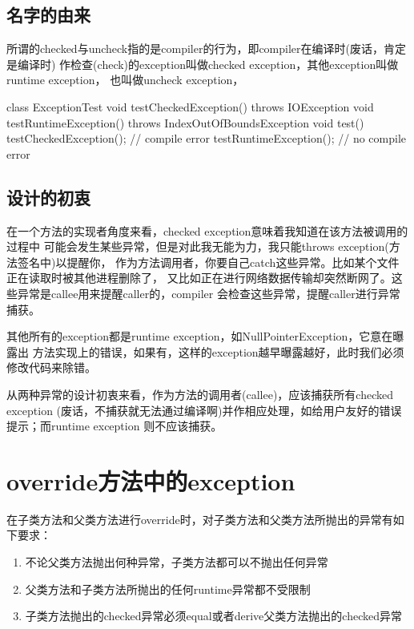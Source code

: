 \documentclass[a4paper,11pt]{article}
\begin{document}
\subsection[名字的由来]{名字的由来}
所谓的checked与uncheck指的是compiler的行为，即compiler在编译时(废话，肯定是编译时)
作检查(check)的exception叫做checked exception，其他exception叫做runtime exception，
也叫做uncheck exception，

\begin{javacode}
class ExceptionTest {
  void testCheckedException() throws IOException { }
  void testRuntimeException() throws IndexOutOfBoundsException { }
  void test() {
    testCheckedException(); // compile error
    testRuntimeException(); // no compile error
  }
}
\end{javacode}

\subsection[设计的初衷]{设计的初衷}
在一个方法的实现者角度来看，checked exception意味着我知道在该方法被调用的过程中
可能会发生某些异常，但是对此我无能为力，我只能throws exception(方法签名中)以提醒你，
作为方法调用者，你要自己catch这些异常。比如某个文件正在读取时被其他进程删除了，
又比如正在进行网络数据传输却突然断网了。这些异常是callee用来提醒caller的，compiler
会检查这些异常，提醒caller进行异常捕获。

其他所有的exception都是runtime exception，如NullPointerException，它意在曝露出
方法实现上的错误，如果有，这样的exception越早曝露越好，此时我们必须修改代码来除错。

从两种异常的设计初衷来看，作为方法的调用者(callee)，应该捕获所有checked exception
(废话，不捕获就无法通过编译啊)并作相应处理，如给用户友好的错误提示；而runtime exception
则不应该捕获。

\section[override方法中的exception]{override方法中的exception}
\label{sec:exceptions-in-override}
在子类方法和父类方法进行override时，对子类方法和父类方法所抛出的异常有如下要求：

\begin{enumerate}
  \item 不论父类方法抛出何种异常，子类方法都可以不抛出任何异常
  \item 父类方法和子类方法所抛出的任何runtime异常都不受限制
  \item 子类方法抛出的checked异常必须equal或者derive父类方法抛出的checked异常
\end{enumerate}
\end{document}
